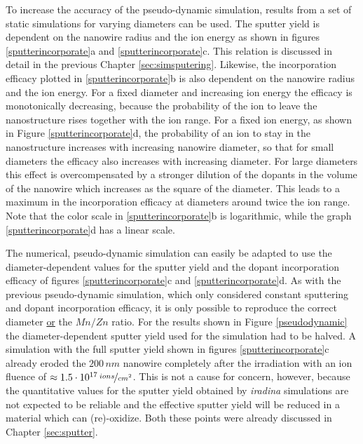 To increase the accuracy of the pseudo-dynamic simulation, results from a set of static simulations for varying diameters can be used. The sputter yield is dependent on the nanowire radius and the ion energy as shown in figures \ref{sputterincorporate}a and \ref{sputterincorporate}c. This relation is discussed in detail in the previous Chapter \ref{sec:simsputering}. Likewise, the incorporation efficacy plotted in \ref{sputterincorporate}b is also dependent on the nanowire radius and the ion energy. For a fixed diameter and increasing ion energy the efficacy is monotonically decreasing, because the probability of the ion to leave the nanostructure rises together with the ion range. For a fixed ion energy, as shown in Figure \ref{sputterincorporate}d, the probability of an ion to stay in the nanostructure increases with increasing nanowire diameter, so that for small diameters the efficacy also increases with increasing diameter. For large diameters this effect is overcompensated by a stronger dilution of the dopants in the volume of the nanowire which increases as the square of the diameter. This leads to a maximum in the incorporation efficacy at diameters around twice the ion range. Note that the color scale in \ref{sputterincorporate}b is logarithmic, while the graph \ref{sputterincorporate}d has a linear scale.



The numerical, pseudo-dynamic simulation can easily be adapted to use the diameter-dependent values for the sputter yield and the dopant incorporation efficacy of figures \ref{sputterincorporate}c and \ref{sputterincorporate}d. As with the previous pseudo-dynamic simulation, which only considered constant sputtering and dopant incorporation efficacy, it is only possible to reproduce the correct diameter \underline{or} the $Mn/Zn$ ratio. For the results shown in Figure \ref{pseudodynamic} the diameter-dependent sputter yield used for the simulation had to be halved. A simulation with the full sputter yield shown in figures \ref{sputterincorporate}c already eroded the $200\,nm$ nanowire completely after the irradiation with an ion fluence of $\approx 1.5\cdot 10^{17}\,\nicefrac{ions}{cm^2}$. This is not a cause for concern, however, because the quantitative values for the sputter yield obtained by \emph{iradina} simulations are not expected to be reliable and the effective sputter yield will be reduced in a material which can (re)-oxidize. Both these points were already discussed in Chapter \ref{sec:sputter}.

